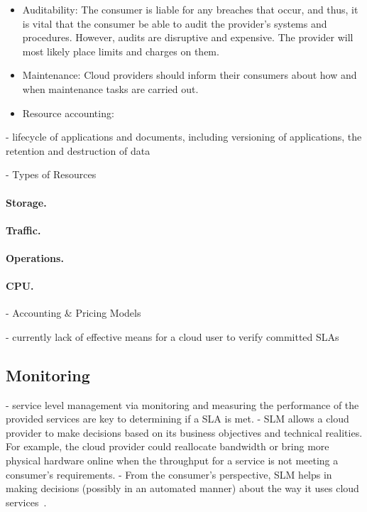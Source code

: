 \begin{itemize}
 \item Auditability: The consumer is liable for any breaches that occur, and thus, it is  vital that the consumer be able to audit the provider's systems and procedures. However, audits are disruptive and expensive. The provider will most likely place limits and charges on them.
 
 \item Maintenance: Cloud providers should inform their consumers about how and when maintenance tasks are carried out.

 \item Resource accounting:
\end{itemize}

- lifecycle of applications and documents, including versioning of applications, the retention and destruction of data 


- Types of Resources

\paragraph{Storage.}

\paragraph{Traffic.}

\paragraph{Operations.}

\paragraph{CPU.}

- Accounting \& Pricing Models~\cite{MMS13}


- currently lack of effective means for a cloud user to verify committed SLAs


\subsection{Monitoring} \label{sect:sla-monitoring}

- service level management via monitoring and measuring the performance of the provided services are key to determining if a SLA is met.
- SLM allows a cloud provider to make decisions based on its business objectives and technical realities. For example, the cloud provider could reallocate bandwidth or bring more physical hardware online when the throughput for a service is not meeting a consumer's requirements.
- From the consumer's perspective, SLM helps in making decisions (possibly in an automated manner) about the way it uses cloud services~\cite{Ahr+10}.


